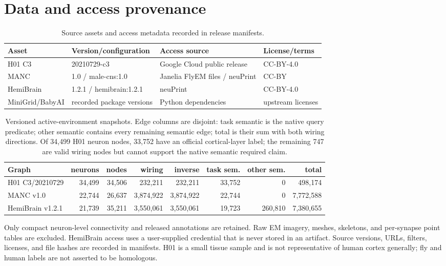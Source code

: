 \documentclass{article}
\begin{document}
\section{Data and access provenance}
\label{app:data-contract}

\begin{table}[h]
\caption{Source assets and access metadata recorded in release manifests.}
\label{tab:asset-licenses}
\centering\scriptsize
\setlength{\tabcolsep}{3pt}
\begin{tabular}{llll}
\toprule
Asset & Version/configuration & Access source & License/terms \\
\midrule
H01 C3 & 20210729-c3 & Google Cloud public release & CC-BY-4.0 \\
MANC & 1.0 / male-cns:1.0 & Janelia FlyEM files / neuPrint & CC-BY \\
HemiBrain & 1.2.1 / hemibrain:1.2.1 & neuPrint & CC-BY-4.0 \\
MiniGrid/BabyAI & recorded package versions & Python dependencies & upstream licenses \\
\bottomrule
\end{tabular}
\end{table}


\begin{table}[h]
\caption{Versioned active-environment snapshots. Edge columns are disjoint:
task semantic is the native query predicate; other semantic contains every
remaining semantic edge; total is their sum with both wiring directions. Of
34,499 H01 neuron nodes, 33,752 have an official cortical-layer label; the
remaining 747 are valid wiring nodes but cannot support the native semantic
required claim.}
\label{tab:data-supp}
\centering
\scriptsize
\setlength{\tabcolsep}{3pt}
\begin{tabular}{lrrrrrrr}
\toprule
Graph & neurons & nodes & wiring & inverse & task sem. & other sem. & total \\
\midrule
H01 C3/20210729 & 34,499 & 34,506 & 232,211 & 232,211 & 33,752 & 0 & 498,174 \\
MANC v1.0 & 22,744 & 26,637 & 3,874,922 & 3,874,922 & 22,744 & 0 & 7,772,588 \\
HemiBrain v1.2.1 & 21,739 & 35,211 & 3,550,061 & 3,550,061 & 19,723 & 260,810 & 7,380,655 \\
\bottomrule
\end{tabular}
\end{table}



Only compact neuron-level connectivity and released annotations are retained.
Raw EM imagery, meshes, skeletons, and per-synapse point tables are excluded.
HemiBrain access uses a user-supplied credential that is never stored in an
artifact. Source versions, URLs, filters, licenses, and file hashes are recorded
in manifests. H01 is a small tissue sample and is not representative of human
cortex generally; fly and human labels are not asserted to be homologous.
\end{document}
